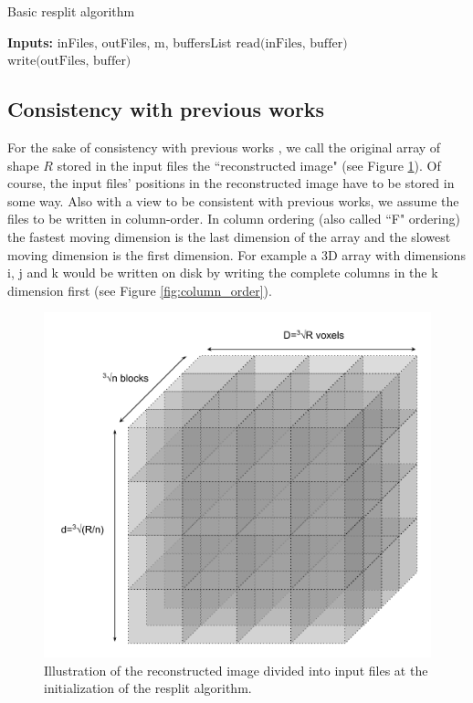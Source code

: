 \documentclass[conference]{IEEEtran}
\begin{document}
\begin{algorithm}[H]
  \caption{Basic resplit algorithm}
  \label{algo:generalresplit}
  \begin{algorithmic}
    \STATE \textbf{Inputs:} {inFiles, outFiles, m, buffersList}
      \STATE $\textrm{read(inFiles, buffer)}$
      \STATE $\textrm{write(outFiles, buffer)}$
    \ENDFOR

  \end{algorithmic}
\end{algorithm}

\subsection{Consistency with previous works}
For the sake of consistency with previous works \cite{seqalgorithms}, we call the original array of shape $R$ stored in the input files the ``reconstructed image" (see Figure \ref{fig:reconstructed_img_divided}).
Of course, the input files' positions in the reconstructed image have to be stored in some way.
Also with a view to be consistent with previous works, we assume the files to be written in column-order.
In column ordering (also called ``F" ordering) the fastest moving dimension is the last dimension of the array and the slowest moving dimension is the first dimension.
For example a 3D array with dimensions i, j and k would be written on disk by writing the complete columns in the k dimension first (see Figure \ref{fig:column_order}).

\begin{figure}[h!]
\centering
\includegraphics[scale=0.4]{./figures/reconstructed_img_divided.png}
\caption{Illustration of the reconstructed image divided into input files at the initialization of the resplit algorithm.
}
\label{fig:reconstructed_img_divided}
\end{figure}
\end{document}
